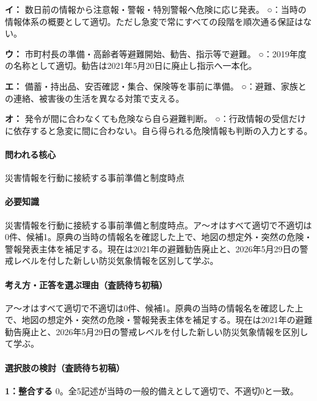 \noindent\textbf{イ：} 数日前の情報から注意報・警報・特別警報へ危険に応じ発表。 ○：当時の情報体系の概要として適切。ただし急変で常にすべての段階を順次通る保証はない。\par

\noindent\textbf{ウ：} 市町村長の準備・高齢者等避難開始、勧告、指示等で避難。 ○：2019年度の名称として適切。勧告は2021年5月20日に廃止し指示へ一本化。\par

\noindent\textbf{エ：} 備蓄・持出品、安否確認・集合、保険等を事前に準備。 ○：避難、家族との連絡、被害後の生活を異なる対策で支える。\par

\noindent\textbf{オ：} 発令が間に合わなくても危険なら自ら避難判断。 ○：行政情報の受信だけに依存すると急変に間に合わない。自ら得られる危険情報も判断の入力とする。\par

\paragraph{問われる核心} 災害情報を行動に接続する事前準備と制度時点

\paragraph{必要知識} 災害情報を行動に接続する事前準備と制度時点。ア〜オはすべて適切で不適切は0件、候補1。原典の当時の情報名を確認した上で、地図の想定外・突然の危険・警報発表主体を補足する。現在は2021年の避難勧告廃止と、2026年5月29日の警戒レベルを付した新しい防災気象情報を区別して学ぶ。

\paragraph{考え方・正答を選ぶ理由（査読待ち初稿）} ア〜オはすべて適切で不適切は0件、候補1。原典の当時の情報名を確認した上で、地図の想定外・突然の危険・警報発表主体を補足する。現在は2021年の避難勧告廃止と、2026年5月29日の警戒レベルを付した新しい防災気象情報を区別して学ぶ。

\paragraph{選択肢の検討（査読待ち初稿）}\mbox{}\par

\noindent\textbf{1：整合する} 0。全5記述が当時の一般的備えとして適切で、不適切0と一致。\par

